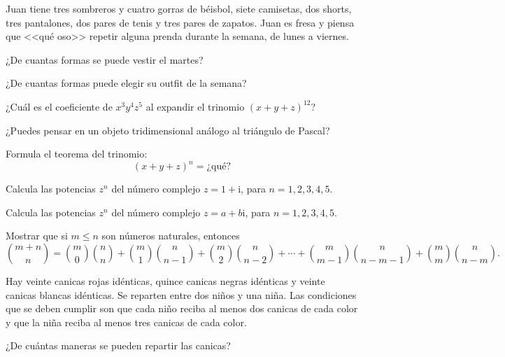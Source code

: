 \begin{ejercicio}
Juan tiene tres sombreros y cuatro gorras de béisbol, siete camisetas, dos shorts, tres pantalones, dos pares de tenis y tres pares de zapatos. Juan es fresa y piensa que <<qué oso>> repetir alguna prenda durante la semana, de lunes a viernes. 

¿De cuantas formas se puede vestir el martes?

¿De cuantas formas puede elegir su outfit de la semana?
\end{ejercicio}

\begin{ejercicio}
¿Cuál es el coeficiente de $x^3y^4z^5$ al expandir el trinomio $(x+y+z)^{12}$?
\end{ejercicio}

\begin{ejercicio}
¿Puedes pensar en un objeto tridimensional análogo al triángulo de Pascal?
\end{ejercicio}

\begin{ejercicio}
Formula el teorema del trinomio: \[(x+y+z)^n=\text{¿qué?}\]
\end{ejercicio}

\begin{ejercicio}
Calcula las potencias $z^n$ del número complejo $z=1+\mathrm i$, para $n=1,2,3,4,5$.
\end{ejercicio}

\begin{ejercicio}
Calcula las potencias $z^n$ del número complejo $z=a+ b\mathrm i$, para $n=1,2,3,4,5$.
\end{ejercicio}

\begin{ejercicio}
Mostrar que si $m\leq n$ son números naturales, entonces
$${m+n\choose n}={m \choose 0}{n \choose n}+{m \choose 1}{n \choose n-1}+{m \choose 2}{n \choose n-2}+\cdots +{m \choose m-1}{n \choose n-m-1}+{m \choose m}{n \choose n-m}.$$
\end{ejercicio}

\begin{ejercicio}
Hay veinte canicas rojas idénticas, quince canicas negras idénticas y veinte canicas blancas idénticas. Se reparten entre dos niños y una niña. Las condiciones que se deben cumplir son que cada niño reciba al menos dos canicas de cada color y que la niña reciba al menos tres canicas de cada color. 

¿De cuántas maneras se pueden repartir las canicas?
\end{ejercicio}
\newpage

